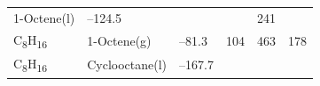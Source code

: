 \documentclass[
  9pt,
]{extbook}
\theoremstyle{definition}
\theoremstyle{definition}
\theoremstyle{definition}
\theoremstyle{remark}
\begin{document}
\begin{longtable}[]{@{}llllll@{}}
\begin{minipage}[t]{0.17\columnwidth}
1-Octene(l)\strut
\end{minipage} & \begin{minipage}[t]{0.15\columnwidth}\raggedright
--124.5\strut
\end{minipage} & \begin{minipage}[t]{0.15\columnwidth}\raggedright
\strut
\end{minipage} & \begin{minipage}[t]{0.14\columnwidth}\raggedright
\strut
\end{minipage} & \begin{minipage}[t]{0.14\columnwidth}\raggedright
241\strut
\end{minipage}\tabularnewline
\begin{minipage}[t]{0.07\columnwidth}\raggedright
C\textsubscript{8}H\textsubscript{16}\strut
\end{minipage} & \begin{minipage}[t]{0.17\columnwidth}\raggedright
1-Octene(g)\strut
\end{minipage} & \begin{minipage}[t]{0.15\columnwidth}\raggedright
--81.3\strut
\end{minipage} & \begin{minipage}[t]{0.15\columnwidth}\raggedright
104\strut
\end{minipage} & \begin{minipage}[t]{0.14\columnwidth}\raggedright
463\strut
\end{minipage} & \begin{minipage}[t]{0.14\columnwidth}\raggedright
178\strut
\end{minipage}\tabularnewline
\begin{minipage}[t]{0.07\columnwidth}\raggedright
C\textsubscript{8}H\textsubscript{16}\strut
\end{minipage} & \begin{minipage}[t]{0.17\columnwidth}\raggedright
Cyclooctane(l)\strut
\end{minipage} & \begin{minipage}[t]{0.15\columnwidth}\raggedright
--167.7\strut
\end{minipage} & \begin{minipage}[t]{0.15\columnwidth}\raggedright
\strut
\end{minipage} & \begin{minipage}[t]{0.14\columnwidth}\raggedright
\strut
\end{minipage} & \begin{minipage}[t]{0.14\columnwidth}\raggedright

\end{minipage}
\end{longtable}
\end{document}
